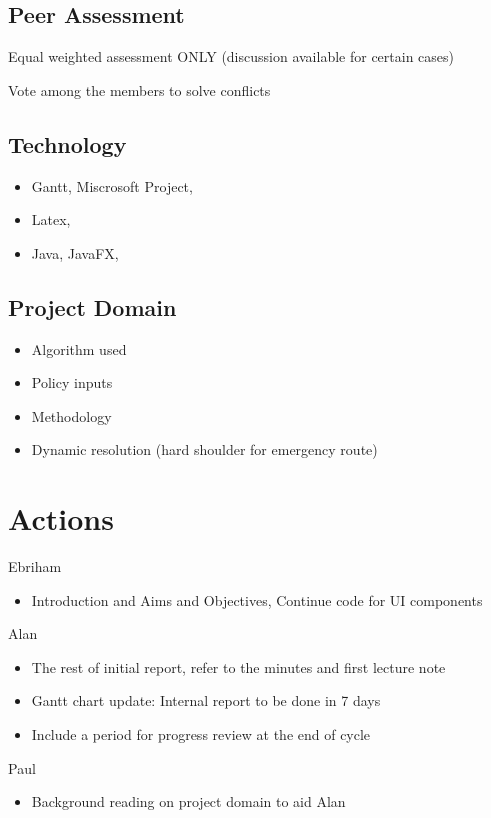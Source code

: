 \documentclass{article}
\begin{document}
\subsection {Peer Assessment}
Equal weighted assessment ONLY (discussion available for certain cases)

Vote among the members to solve conflicts 

\subsection {Technology}
\begin{itemize}
\item Gantt, Miscrosoft Project, 
\item Latex,  
\item Java, JavaFX,
\end{itemize}

\subsection{Project Domain}
\begin{itemize}
\item Algorithm used 
\item Policy inputs 
\item Methodology
\item Dynamic resolution (hard shoulder for emergency route)
\end{itemize}


\section {Actions}
Ebriham 
\begin{itemize}
\item Introduction and Aims and Objectives, Continue code for UI components
\end{itemize}

\noindent
Alan
\begin{itemize}
\item The rest of initial report, refer to the minutes and first lecture note 
\item Gantt chart update: Internal report to be done in 7 days 
\item Include a period for progress review at the end of cycle           
\end{itemize}

\noindent
Paul
\begin{itemize}
\item Background reading on project domain to aid Alan 
\end{itemize}
\end{document}
